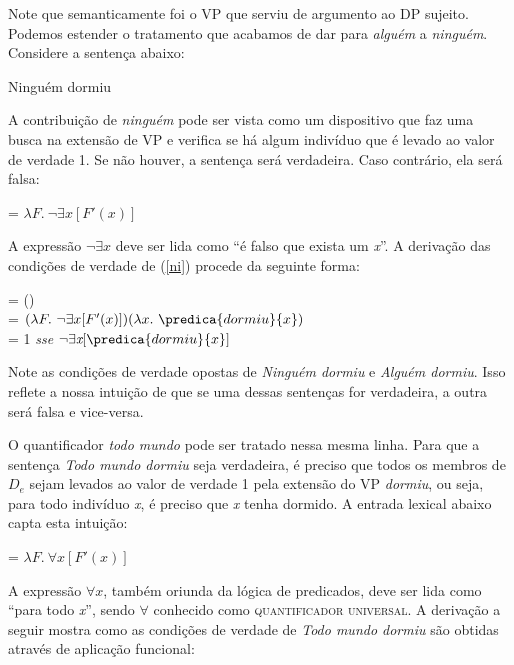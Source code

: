 Note que semanticamente foi o VP que serviu de argumento ao DP sujeito. Podemos estender o tratamento que acabamos de dar para \textit{alguém} a
\textit{ninguém}. Considere a sentença abaixo:

\begin{exe}
    \ex Ninguém dormiu \label{ni}
\end{exe}

A contribuição de \textit{ninguém} pode ser vista como um dispositivo que
faz uma busca na extensão de VP e verifica se há algum indivíduo
que é levado ao valor de verdade 1. Se não houver, a sentença será
verdadeira. Caso contrário, ela será falsa:\\

\begin{exe}
	\ex {} = $\lambda F.\ \neg\exists x [ F'(x)]$
\end{exe}

\n A expressão \underline{$\neg\exists \textit{x}$} deve ser lida como ``é falso que exista um \textit{x}''. A derivação das condições de verdade de (\ref{ni}) procede da
seguinte forma:

\begin{exe}
	\ex {} = () \\
	= $(\lambda F.\ \neg\exists x[F'(x)])(\lambda x.\ \predica{dormiu}{x})$\\
	= 1 \textit{sse} $\neg\exists \textit{x}[\predica{dormiu}{x}]$
\end{exe}

\n Note as condições de verdade opostas de \textit{Ninguém dormiu} e
\textit{Alguém dormiu}. Isso reflete a nossa intuição de que se uma
dessas sentenças for verdadeira, a outra será falsa e vice-versa.

O quantificador \textit{todo mundo} pode ser tratado nessa mesma linha.
Para que a sentença \textit{Todo mundo dormiu} seja verdadeira, é preciso
que todos os membros de $D_{e}$ sejam levados ao valor de verdade 1
pela extensão do VP \textit{dormiu}, ou seja, para todo indivíduo
\textit{x}, é preciso que \textit{x} tenha dormido. A entrada
lexical abaixo capta esta intuição:

\begin{exe}
	\ex {} = $\lambda F.\ \forall x [F'(x)]$
\end{exe}

A expressão \underline{$\forall x$}, também oriunda da lógica de predicados, deve ser lida como ``para todo \textit{x}'', sendo $\forall$ conhecido como \textsc{quantificador universal}. A derivação a seguir mostra como as condições de verdade de
\textit{Todo mundo dormiu} são obtidas através de aplicação
funcional:

